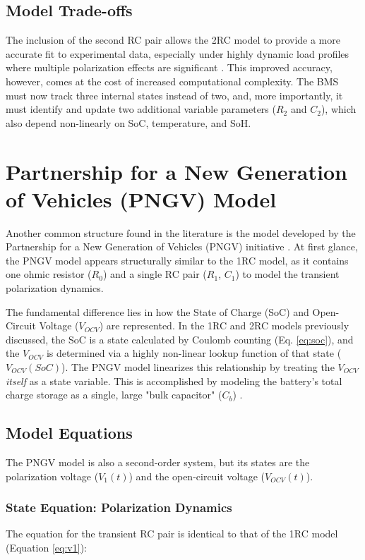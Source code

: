 \documentclass[]{article}
\begin{document}
\subsection{Model Trade-offs}
The inclusion of the second RC pair allows the 2RC model to provide a more accurate fit to experimental data, especially under highly dynamic load profiles where multiple polarization effects are significant \cite{khalfi2021electric}. This improved accuracy, however, comes at the cost of increased computational complexity. The BMS must now track three internal states instead of two, and, more importantly, it must identify and update two additional variable parameters ($R_2$ and $C_2$), which also depend non-linearly on SoC, temperature, and SoH.

\section{Partnership for a New Generation of Vehicles (PNGV) Model}

Another common structure found in the literature is the model developed by the Partnership for a New Generation of Vehicles (PNGV) initiative \cite{tekin2024comparative}. At first glance, the PNGV model appears structurally similar to the 1RC model, as it contains one ohmic resistor ($R_0$) and a single RC pair ($R_1$, $C_1$) to model the transient polarization dynamics.

The fundamental difference lies in how the State of Charge (SoC) and Open-Circuit Voltage ($V_{OCV}$) are represented. In the 1RC and 2RC models previously discussed, the SoC is a state calculated by Coulomb counting (Eq. \ref{eq:soc}), and the $V_{OCV}$ is determined via a highly non-linear lookup function of that state ($V_{OCV}(SoC)$). The PNGV model linearizes this relationship by treating the $V_{OCV}$ \textit{itself} as a state variable. This is accomplished by modeling the battery's total charge storage as a single, large "bulk capacitor" ($C_b$) \cite{tekin2024comparative}.

\subsection{Model Equations}

The PNGV model is also a second-order system, but its states are the polarization voltage ($V_1(t)$) and the open-circuit voltage ($V_{OCV}(t)$).

\subsubsection{State Equation: Polarization Dynamics}
The equation for the transient RC pair is identical to that of the 1RC model (Equation \ref{eq:v1}):
\end{document}
